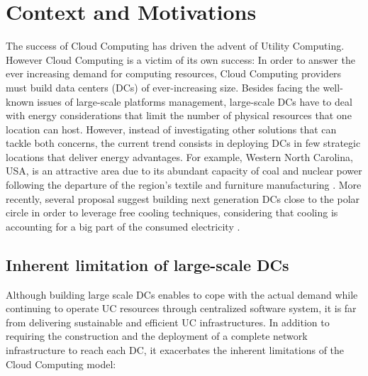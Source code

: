 \section{Context and Motivations}
\label{sec:intro}
The success of Cloud Computing has driven the advent of Utility Computing.
However Cloud Computing is a victim of its own success: In order to answer the
ever increasing demand for computing resources, Cloud Computing providers must
build data centers (DCs) of ever-increasing size. Besides facing the well-known
issues of large-scale platforms management, large-scale DCs have to deal with
energy considerations that limit the number of physical resources that one
location can host.
%
However, instead of investigating other solutions that can tackle both
concerns, the current trend consists in deploying  DCs in few
strategic locations that deliver energy advantages.  For example, Western North
Carolina, USA, is an attractive area due to its abundant capacity of coal
and nuclear power following the departure of the region's textile and furniture
manufacturing \cite{xxx}.  More recently, several proposal suggest building next
generation DCs close to the polar circle  in order to leverage free cooling
techniques, considering that cooling is accounting for a big part of the
consumed electricity \cite{xxxx}. 


\subsection{Inherent limitation of large-scale DCs}

Although building large scale DCs  enables to cope with the actual demand while
continuing to operate UC resources through centralized software system, it is
far from delivering sustainable and efficient UC infrastructures.  In addition
to requiring the construction and the deployment of a complete network
infrastructure to reach each DC, it exacerbates the inherent limitations of the
Cloud Computing model:

